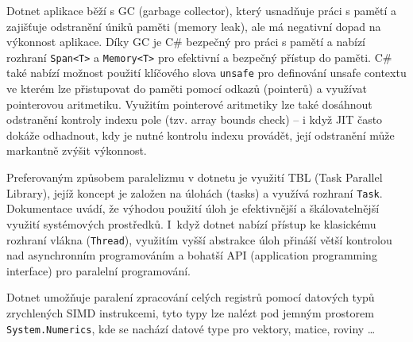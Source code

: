 Dotnet aplikace běží s GC (garbage collector), který usnadňuje práci s pamětí a zajišťuje odstranění úniků paměti (memory leak), ale má negativní dopad na výkonnost aplikace. Díky GC je C\# bezpečný pro práci s pamětí a nabízí rozhraní \texttt{Span<T>} a \texttt{Memory<T>} pro efektivní a bezpečný přístup do paměti. C\# také nabízí možnost použití klíčového slova \texttt{unsafe} pro definování unsafe contextu ve kterém lze přistupovat do paměti  pomocí odkazů (pointerů) a využívat pointerovou aritmetiku. Využitím pointerové aritmetiky lze také dosáhnout odstranění kontroly indexu pole (tzv. array bounds check) -- i když JIT často dokáže odhadnout, kdy je nutné kontrolu indexu provádět, její odstranění může markantně zvýšit výkonnost. 

Preferovaným způsobem paralelizmu v dotnetu je využití TBL (Task Parallel Library), jejíž koncept je založen na úlohách (tasks) a využívá rozhraní \texttt{Task}. Dokumentace \cite{dotnet_doc:tbl} uvádí, že výhodou použití úloh je efektivnější a škálovatelnější využití systémových prostředků. I~když dotnet nabízí přístup ke klasickému rozhraní vlákna (\texttt{Thread}), využitím vyšší abstrakce úloh přináší větší kontrolou nad asynchronním programováním a bohatší API (application programming interface) pro paralelní programování. 

Dotnet umožňuje paralení zpracování celých registrů pomocí datových typů zrychlených SIMD instrukcemi, tyto typy lze nalézt pod jemným prostorem \texttt{System.Numerics}, kde se nachází datové type pro vektory, matice, roviny \dots

